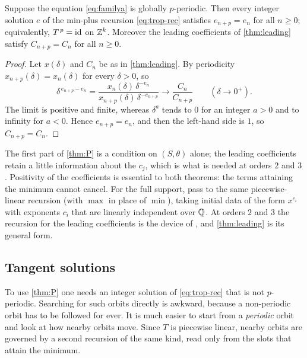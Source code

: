 \begin{theorem}
\label{thm:P}
Suppose the equation \eqref{eq:familya} is globally $p$-periodic. Then every
integer solution $e$ of the min-plus recursion \eqref{eq:trop-rec} satisfies
$e_{n+p}=e_n$ for all $n\ge0$; equivalently, $T^{\,p}=\mathrm{id}$ on $\mathbb{Z}^k$. Moreover the
leading coefficients of \autoref{thm:leading} satisfy $C_{n+p}=C_n$ for all
$n\ge0$.
\end{theorem}

\begin{proof}
Let $x(\delta)$ and $C_n$ be as in \autoref{thm:leading}. By periodicity
$x_{n+p}(\delta)=x_n(\delta)$ for every $\delta>0$, so
\[
\delta^{\,e_{n+p}-e_n}
=\frac{x_n(\delta)\,\delta^{-e_n}}{x_{n+p}(\delta)\,\delta^{-e_{n+p}}}
\longrightarrow\frac{C_n}{C_{n+p}}\qquad(\delta\to0^+).
\]
The limit is positive and finite, whereas $\delta^{a}$ tends to $0$ for an
integer $a>0$ and to infinity for $a<0$. Hence $e_{n+p}=e_n$, and then the left-hand
side is $1$, so $C_{n+p}=C_n$.
\end{proof}

The first part of \autoref{thm:P} is a condition on $(S,\theta)$ alone; the
leading coefficients retain a little information about the $c_j$, which is
what is needed at orders $2$ and $3$. Positivity of the coefficients is essential to
both theorems: the terms attaining the minimum cannot cancel. For the full support,
\citet[Lemma~8]{CsornyeiLaczkovich2001} pass to the same piecewise-linear
recursion (with $\max$ in place of $\min$), taking initial data of the form
$x^{c_i}$ with exponents $c_i$ that are linearly independent over $\mathbb{Q}$. At
orders $2$ and $3$ the recursion for the leading coefficients is the device of
\citet[Lemma~5]{CsornyeiLaczkovich2001}, and \autoref{thm:leading} is its
general form.

\subsection{Tangent solutions}
\label{sec:trop-tangent}

To use \autoref{thm:P} one needs an integer solution of \eqref{eq:trop-rec} that is
not $p$-periodic. Searching for such orbits directly is awkward, because a
non-periodic orbit has to be followed for ever. It is much easier to start from a
\textit{periodic} orbit and look at how nearby orbits move. Since $T$ is piecewise
linear, nearby orbits are governed by a second recursion of the same kind, read only
from the slots that attain the minimum.

